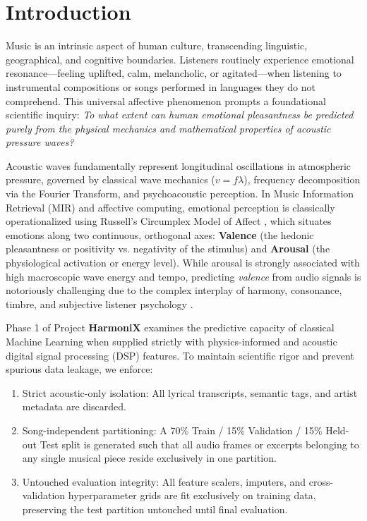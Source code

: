\documentclass[conference]{IEEEtran}
\begin{document}
\section{Introduction}
Music is an intrinsic aspect of human culture, transcending linguistic, geographical, and cognitive boundaries. Listeners routinely experience emotional resonance---feeling uplifted, calm, melancholic, or agitated---when listening to instrumental compositions or songs performed in languages they do not comprehend. This universal affective phenomenon prompts a foundational scientific inquiry: \textit{To what extent can human emotional pleasantness be predicted purely from the physical mechanics and mathematical properties of acoustic pressure waves?}

Acoustic waves fundamentally represent longitudinal oscillations in atmospheric pressure, governed by classical wave mechanics ($v = f \lambda$), frequency decomposition via the Fourier Transform, and psychoacoustic perception. In Music Information Retrieval (MIR) and affective computing, emotional perception is classically operationalized using Russell's Circumplex Model of Affect \cite{russell1980circumplex}, which situates emotions along two continuous, orthogonal axes: \textbf{Valence} (the hedonic pleasantness or positivity vs. negativity of the stimulus) and \textbf{Arousal} (the physiological activation or energy level). While arousal is strongly associated with high macroscopic wave energy and tempo, predicting \textit{valence} from audio signals is notoriously challenging due to the complex interplay of harmony, consonance, timbre, and subjective listener psychology \cite{yang2011music}.

Phase 1 of Project \textbf{HarmoniX} examines the predictive capacity of classical Machine Learning when supplied strictly with physics-informed and acoustic digital signal processing (DSP) features. To maintain scientific rigor and prevent spurious data leakage, we enforce:
\begin{enumerate}
    \item Strict acoustic-only isolation: All lyrical transcripts, semantic tags, and artist metadata are discarded.
    \item Song-independent partitioning: A 70\% Train / 15\% Validation / 15\% Held-out Test split is generated such that all audio frames or excerpts belonging to any single musical piece reside exclusively in one partition.
    \item Untouched evaluation integrity: All feature scalers, imputers, and cross-validation hyperparameter grids are fit exclusively on training data, preserving the test partition untouched until final evaluation.
\end{enumerate}
\end{document}
